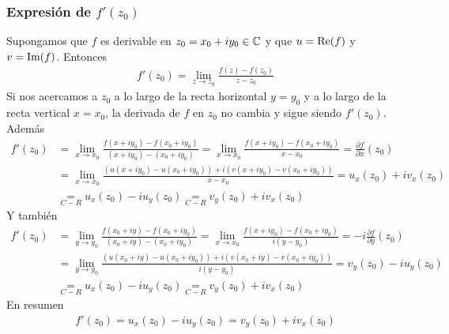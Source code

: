 \subsubsection{Expresión de $f'(z_0)$}
Supongamos que $f$ es derivable en $z_0 = x_0 + iy_0 \in \mathbb{C}$ y que $u = \text{Re}(f)$ y $v = \text{Im}(f)$. Entonces
\begin{align*}
    f'(z_0) = \lim_{z \to z_0}{\frac{f(z) - f(z_0)}{z -z_0}}
\end{align*}
Si nos acercamos a $z_0$ a lo largo de la recta horizontal $y = y_0$ y a lo largo de la recta vertical $x = x_0$, la derivada de $f$ en $z_0$ no cambia y sigue siendo $f'(z_0)$. Además
\begin{align*}
    f'(z_0) & = \lim_{x \to x_0}{\frac{f(x + iy_0) - f(x_0 + iy_0)}{(x + iy_0) - (x_0 + iy_0)}} = \lim_{x \to x_0}{\frac{f(x + iy_0) - f(x_0 + iy_0)}{x -x_0}} = \frac{\partial f}{\partial x}(z_0) \\
            & = \lim_{x \to x_0}{\frac{(u(x+iy_0) - u(x_0 +iy_0)) + i(v(x + iy_0) - v(x_0 + iy_0))}{x-x_0}} = u_x(z_0) + iv_x(z_0)                                                                  \\
            & \underset{C-R}{=} u_x(z_0) - iu_y(z_0) \underset{C-R}{=} v_y(z_0) + iv_x(z_0)
\end{align*}
Y también
\begin{align*}
    f'(z_0) & = \lim_{y \to y_0}{\frac{f(x_0 + iy) - f(x_0 + iy_0)}{(x_0 + iy) - (x_0 + iy_0)}} = \lim_{x \to x_0}{\frac{f(x + iy_0) - f(x_0 + iy_0)}{i(y -y_0)}} = -i\frac{\partial f}{\partial y}(z_0) \\
            & = \lim_{y \to y_0}{\frac{(u(x_0+iy) - u(x_0 +iy_0)) + i(v(x_0 + iy) - v(x_0 + iy_0))}{i(y-y_0)}} = v_y(z_0) - iu_y(z_0)                                                                    \\
            & \underset{C-R}{=} u_x(z_0) - iu_y(z_0) \underset{C-R}{=} v_y(z_0) + iv_x(z_0)
\end{align*}
En resumen
\begin{align*}
    \boxed{
        f'(z_0) = u_x(z_0) - iu_y(z_0) = v_y(z_0) + iv_x(z_0)
    }
\end{align*}

